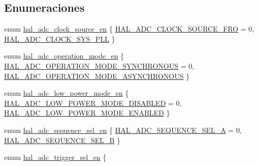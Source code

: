 \subsection*{Enumeraciones}
\begin{DoxyCompactItemize}
\item 
enum \hyperlink{group__ADC_gaee7bd99d368af2a425a9954a9e811a51}{hal\+\_\+adc\+\_\+clock\+\_\+source\+\_\+en} \{ \hyperlink{group__ADC_ggaee7bd99d368af2a425a9954a9e811a51a75a03c616d0b74267642f2b860b19a4c}{H\+A\+L\+\_\+\+A\+D\+C\+\_\+\+C\+L\+O\+C\+K\+\_\+\+S\+O\+U\+R\+C\+E\+\_\+\+F\+RO} = 0, 
\hyperlink{group__ADC_ggaee7bd99d368af2a425a9954a9e811a51ad8be01dc9a2af6e29ab24f823fc40560}{H\+A\+L\+\_\+\+A\+D\+C\+\_\+\+C\+L\+O\+C\+K\+\_\+\+S\+Y\+S\+\_\+\+P\+LL}
 \}
\item 
enum \hyperlink{group__ADC_ga21b6c00c4fe5d9ba0d36440222e5d210}{hal\+\_\+adc\+\_\+operation\+\_\+mode\+\_\+en} \{ \hyperlink{group__ADC_gga21b6c00c4fe5d9ba0d36440222e5d210a96e8c1882e02aa44af86a86c96c8f98d}{H\+A\+L\+\_\+\+A\+D\+C\+\_\+\+O\+P\+E\+R\+A\+T\+I\+O\+N\+\_\+\+M\+O\+D\+E\+\_\+\+S\+Y\+N\+C\+H\+R\+O\+N\+O\+US} = 0, 
\hyperlink{group__ADC_gga21b6c00c4fe5d9ba0d36440222e5d210a11b6528b4acdeb7b7f11bbff4e0491a1}{H\+A\+L\+\_\+\+A\+D\+C\+\_\+\+O\+P\+E\+R\+A\+T\+I\+O\+N\+\_\+\+M\+O\+D\+E\+\_\+\+A\+S\+Y\+N\+C\+H\+R\+O\+N\+O\+US}
 \}
\item 
enum \hyperlink{group__ADC_gaf1570443ca3570a7ae83b90307bbecca}{hal\+\_\+adc\+\_\+low\+\_\+power\+\_\+mode\+\_\+en} \{ \hyperlink{group__ADC_ggaf1570443ca3570a7ae83b90307bbeccaaf92172fb70ce285c23631cb025b3cd52}{H\+A\+L\+\_\+\+A\+D\+C\+\_\+\+L\+O\+W\+\_\+\+P\+O\+W\+E\+R\+\_\+\+M\+O\+D\+E\+\_\+\+D\+I\+S\+A\+B\+L\+ED} = 0, 
\hyperlink{group__ADC_ggaf1570443ca3570a7ae83b90307bbeccaaf3c25521b4c61b46bfe7771db9370769}{H\+A\+L\+\_\+\+A\+D\+C\+\_\+\+L\+O\+W\+\_\+\+P\+O\+W\+E\+R\+\_\+\+M\+O\+D\+E\+\_\+\+E\+N\+A\+B\+L\+ED}
 \}
\item 
enum \hyperlink{group__ADC_ga9297d7b14d7018a94bce94f0103d8559}{hal\+\_\+adc\+\_\+sequence\+\_\+sel\+\_\+en} \{ \hyperlink{group__ADC_gga9297d7b14d7018a94bce94f0103d8559aa8ec9c3fb5a00f2169651f2b1f63df0f}{H\+A\+L\+\_\+\+A\+D\+C\+\_\+\+S\+E\+Q\+U\+E\+N\+C\+E\+\_\+\+S\+E\+L\+\_\+A} = 0, 
\hyperlink{group__ADC_gga9297d7b14d7018a94bce94f0103d8559a109de2c585363efee84dbfb7eee7a1c5}{H\+A\+L\+\_\+\+A\+D\+C\+\_\+\+S\+E\+Q\+U\+E\+N\+C\+E\+\_\+\+S\+E\+L\+\_\+B}
 \}
\item 
enum \hyperlink{group__ADC_ga67fe859b54301579f1b1daef874514ca}{hal\+\_\+adc\+\_\+trigger\+\_\+sel\+\_\+en} \{ \newline

\end{DoxyCompactItemize}
